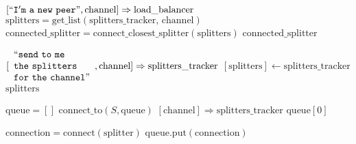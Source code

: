 \documentclass{article}
\begin{document}
\pagestyle{empty}

\newcommand{\send}{\Rightarrow}
\newcommand{\sendto}{\rightarrow}
\algrenewcommand{}
\algrenewcommand\textproc{\textrm}

\begin{algorithmic}

  
  \State $[``\mathtt{I'm~a~new~peer}", \text{channel}] \send \text{load\_balancer}$
  \State $\text{splitters} = \text{get\_list}(\text{splitters\_tracker, channel})$
  \State $\text{connected\_splitter} = \text{connect\_closest\_splitter}(\text{splitters})$
  \State \Return $\text{connected\_splitter}$
  \EndFunction

  
  \State $[\begin{array}{l}``\mathtt{send~to~me~}\\\mathtt{the~splitters}\\\mathtt{for~the~channel}"\end{array}, \text{channel}] \send \text{splitters\_tracker}$
  \State $[\mathrm{splitters}] \gets \mathrm{splitters\_tracker}$
  \State \Return $\mathrm{splitters}$
  \EndFunction

  \State $\mathrm{queue}=[]$
  \State $\text{connect\_to}(S, \text{queue})$
  \EndFor 
  \State $[\text{channel}] \send \text{splitters\_tracker}$
  \State \Return $\mathrm{queue}[0]$
  \EndFunction

  \algrenewcommand{}

  \State $\text{connection} = \mathrm{connect}(\text{splitter})$
  \State $\text{queue}.\text{put}(\text{connection})$
  \EndIf
  \EndFunction

  \EndProcedure

\end{algorithmic}
\end{document}
